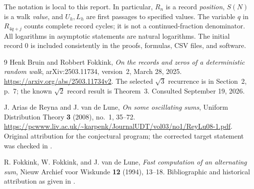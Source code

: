 \documentclass[11pt]{article}
\theoremstyle{definition}
\numberwithin{equation}{section}
\begin{document}
The notation is local to this report. In particular, $R_n$ is a record \emph{position}, $S(N)$ is a walk \emph{value}, and $U_h,L_h$ are first passages to specified values. The variable $q$ in $R_{4q+j}$ counts complete record cycles; it is not a continued-fraction denominator. All logarithms in asymptotic statements are natural logarithms. The initial record $0$ is included consistently in the proofs, formulas, CSV files, and software.

\begin{thebibliography}{9}
Henk Bruin and Robbert Fokkink,
\emph{On the records and zeros of a deterministic random walk},
arXiv:2503.11734, version~2, March 28, 2025.
\url{https://arxiv.org/abs/2503.11734v2}.
The selected $\sqrt3$ recurrence is in Section~2, p.~7; the known $\sqrt2$ record result is Theorem~3. Consulted September 19, 2026.

J. Arias de Reyna and J. van de Lune,
\emph{On some oscillating sums},
Uniform Distribution Theory \textbf{3} (2008), no.~1, 35--72.
\url{https://pcwww.liv.ac.uk/~karpenk/JournalUDT/vol03/no1/ReyLu08-1.pdf}.
Original attribution for the conjectural program; the corrected target statement was checked in \cite{BF}.

R. Fokkink, W. Fokkink, and J. van de Lune,
\emph{Fast computation of an alternating sum},
Nieuw Archief voor Wiskunde \textbf{12} (1994), 13--18.
Bibliographic and historical attribution as given in \cite{BF}.
\end{thebibliography}
\end{document}
